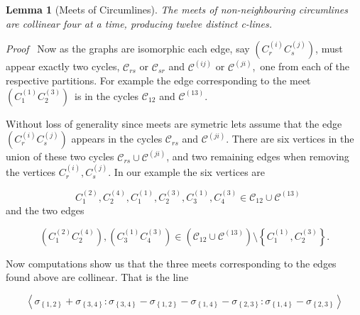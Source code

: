 \documentclass[11pt]{article}
\newtheorem{theorem}{Theorem}
\newtheorem{theorem}{Lemma}
\begin{document}
\begin{theorem}[Meets of Circumlines]
The meets of non-neighbouring circumlines are collinear four at a time,
producing twelve distinct c-lines.
\end{theorem}

\textit{Proof} \ Now as the graphs are isomorphic each edge, say $\left(
C_{r}^{\left( i\right) }C_{s}^{\left( j\right) }\right) $, must appear
exactly two cycles, $\mathcal{C}_{rs}$ or $\mathcal{C}_{sr}$ and $\mathcal{C}%
^{\left( ij\right) }$ or $\mathcal{C}^{\left( ji\right) }$,\ one from each
of the respective partitions. For example the edge corresponding to the meet 
$\left( C_{1}^{\left( 1\right) }C_{2}^{\left( 3\right) }\right) $\ is in the
cycles $\mathcal{C}_{12}$ and $\mathcal{C}^{\left( 13\right) }$. 

Without loss of generality since meets are symetric lets assume that the
edge $\left( C_{r}^{\left( i\right) }C_{s}^{\left( j\right) }\right) $
appears in the cycles $\mathcal{C}_{rs}$ and  $\mathcal{C}^{\left( ji\right)
}$. There are six vertices in the union of these two cycles $\mathcal{C}%
_{rs}\cup \mathcal{C}^{\left( ji\right) }$, and two remaining edges when
removing the vertices $C_{r}^{\left( i\right) },C_{s}^{\left( j\right) }$.
In our example the six vertices are

\begin{equation*}
\text{ }C_{1}^{\left( 2\right) },C_{2}^{\left( 4\right) },C_{1}^{\left(
1\right) },C_{2}^{\left( 3\right) },C_{3}^{\left( 1\right) },C_{4}^{\left(
3\right) }\in \mathcal{C}_{12}\cup \mathcal{C}^{\left( 13\right) }
\end{equation*}%
and the two edges

\begin{equation*}
\left( C_{1}^{\left( 2\right) }C_{2}^{\left( 4\right) }\right) ,\left(
C_{3}^{\left( 1\right) }C_{4}^{\left( 3\right) }\right) \in \left( \mathcal{C%
}_{12}\cup \mathcal{C}^{\left( 13\right) }\right) \setminus \left\{
C_{1}^{\left( 1\right) },C_{2}^{\left( 3\right) }\right\} .
\end{equation*}

Now computations show us that the three meets corresponding to the edges
found above are collinear. That is the line

\begin{equation*}
\left\langle \sigma _{\left\{ 1,2\right\} }+\sigma _{\left\{ 3,4\right\}
}:\sigma _{\left\{ 3,4\right\} }-\sigma _{\left\{ 1,2\right\} }-\sigma
_{\left\{ 1,4\right\} }-\sigma _{\left\{ 2,3\right\} }:\sigma _{\left\{
1,4\right\} }-\sigma _{\left\{ 2,3\right\} }\right\rangle 
\end{equation*}
\end{document}
